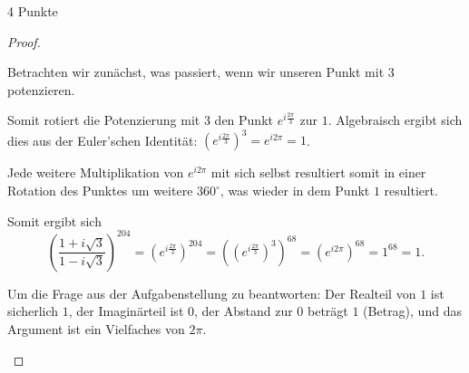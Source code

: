 \documentclass{problemset}
\begin{document}
\begin{problem}{4 Punkte}
\begin{proof}
\begin{enumerate}
              Betrachten wir zunächst, was passiert, wenn wir unseren Punkt mit
              $3$ potenzieren.

              \begin{center}
              \end{center}

              Somit rotiert die Potenzierung mit $3$ den Punkt $e^{i\frac{2 \pi
              }{3}}$ zur $1$. Algebraisch ergibt sich dies aus der Euler'schen
              Identität: $({e^{i\frac{2 \pi }{3}}})^3 = e^{i2\pi} = 1$.

              Jede weitere Multiplikation von $e^{i2\pi}$ mit sich selbst
              resultiert somit in einer Rotation des Punktes um weitere
              $360^\circ$, was wieder in dem Punkt $1$ resultiert.

              Somit ergibt sich
              \[
                  {\left(\frac{1+i\sqrt{3}}{1-i\sqrt{3}}\right)}^{204}
                  = {(e^{i\frac{2 \pi }{3}} )}^{204}
                      = {({(e^{i\frac{2 \pi }{3}} )}^3)}^{68}
                      = {(e^{i2\pi})}^{68}
                      = 1^{68}
                  = 1.
              \]

              Um die Frage aus der Aufgabenstellung zu beantworten: Der
              Realteil von $1$ ist sicherlich $1$, der Imaginärteil ist $0$,
              der Abstand zur $0$ beträgt $1$ (Betrag), und das Argument ist
              ein Vielfaches von $2\pi$.


\end{enumerate}
\end{proof}
\end{problem}
\end{document}
